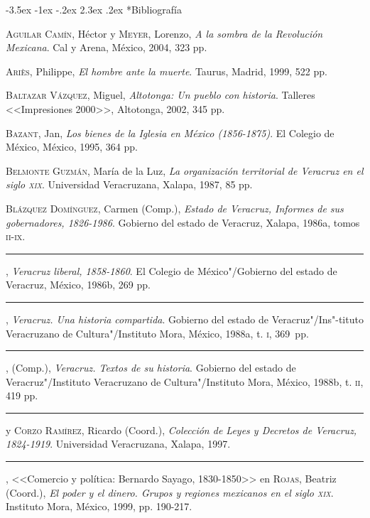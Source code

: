 \documentclass[14pt,twoside,final]{extbook} %
\makeatletter
\renewcommand\section{\@startsection {section}{1}{\z@}%
                                     {-3.5ex \@plus -1ex \@minus -.2ex}%
                                     {2.3ex \@plus .2ex}%
                                     {\normalfont\large\bfseries\sc}}
\makeatother
\begin{document}
\section*{Bibliografía}\label{sec:bibliografia}
\textsc{Aguilar Camín}, Héctor y \textsc{Meyer}, Lorenzo, \emph{A la sombra de la Revolución Mexicana}. Cal y Arena, México, 2004, 323 pp.

\textsc{Ariès}, Philippe, \emph{El hombre ante la muerte}. Taurus, Madrid, 1999, 522 pp.

\textsc{Baltazar Vázquez}, Miguel, \emph{Altotonga: Un pueblo con historia}. Talleres <<Impresiones 2000>>, Altotonga, 2002, 345 pp.

\textsc{Bazant}, Jan, \emph{Los bienes de la Iglesia en México (1856-1875)}. El Colegio de México, México, 1995, 364 pp.

\textsc{Belmonte Guzmán}, María de la Luz, \emph{La organización territorial de Veracruz en el siglo \textsc{xix}}. Universidad Veracruzana, Xalapa, 1987, 85 pp.

\textsc{Blázquez Domínguez}, Carmen (Comp.), \emph{Estado de Veracruz, Informes de sus gobernadores, 1826-1986}. Gobierno del estado de Veracruz, Xalapa, 1986a, tomos \textsc{ii-ix}.

\rule{1cm}{0.4pt}, \emph{Veracruz liberal, 1858-1860}. El Colegio de México"/Gobierno del estado de Veracruz, México, 1986b, 269 pp.

\rule{1cm}{0.4pt}, \emph{Veracruz. Una historia compartida}. Gobierno del estado de Veracruz"/Ins"-tituto Veracruzano de Cultura"/Instituto Mora, México, 1988a, t. \textsc{i}, 369~pp.

\rule{1cm}{0.4pt}, (Comp.), \emph{Veracruz. Textos de su historia}. Gobierno del estado de Veracruz"/Instituto Veracruzano de Cultura"/Instituto Mora, México, 1988b, t. \textsc{ii}, 419 pp.

\rule{1cm}{0.4pt} y \textsc{Corzo Ramírez}, Ricardo (Coord.), \emph{Colección de Leyes y Decretos de Veracruz, 1824-1919}. Universidad Veracruzana, Xalapa, 1997.

\rule{1cm}{0.4pt}, <<Comercio y política: Bernardo Sayago, 1830-1850>> en \textsc{Rojas}, Beatriz (Coord.), \emph{El poder y el dinero. Grupos y regiones mexicanos en el siglo \textsc{xix}}. Instituto Mora, México, 1999, pp. 190-217.
\end{document}
